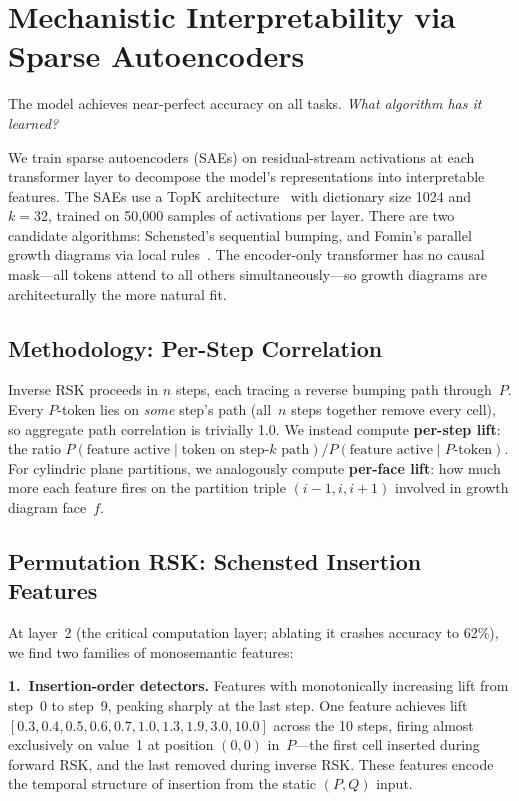 \documentclass[11pt,a4paper]{article}
\begin{document}
\section{Mechanistic Interpretability via Sparse Autoencoders}

The model achieves near-perfect accuracy on all tasks. \emph{What algorithm has it learned?}

We train sparse autoencoders (SAEs) on residual-stream activations at each transformer layer to decompose the model's representations into interpretable features. The SAEs use a TopK architecture~\cite{bricken2023} with dictionary size 1024 and $k{=}32$, trained on 50{,}000 samples of activations per layer. There are two candidate algorithms: Schensted's sequential bumping, and Fomin's parallel growth diagrams via local rules~\cite{langer2013}. The encoder-only transformer has no causal mask---all tokens attend to all others simultaneously---so growth diagrams are architecturally the more natural fit.

\subsection{Methodology: Per-Step Correlation}

Inverse RSK proceeds in $n$ steps, each tracing a reverse bumping path through~$P$. Every $P$-token lies on \emph{some} step's path (all~$n$ steps together remove every cell), so aggregate path correlation is trivially 1.0. We instead compute \textbf{per-step lift}: the ratio $P(\text{feature active} \mid \text{token on step-$k$ path}) / P(\text{feature active} \mid \text{$P$-token})$. For cylindric plane partitions, we analogously compute \textbf{per-face lift}: how much more each feature fires on the partition triple $(i{-}1, i, i{+}1)$ involved in growth diagram face~$f$.

\subsection{Permutation RSK: Schensted Insertion Features}

At layer~2 (the critical computation layer; ablating it crashes accuracy to 62\%), we find two families of monosemantic features:

\textbf{1.~Insertion-order detectors.}
Features with monotonically increasing lift from step~0 to step~9, peaking sharply at the last step. One feature achieves lift $[0.3, 0.4, 0.5, 0.6, 0.7, 1.0, 1.3, 1.9, 3.0, 10.0]$ across the 10 steps, firing almost exclusively on value~1 at position $(0,0)$ in~$P$---the first cell inserted during forward RSK, and the last removed during inverse RSK. These features encode the temporal structure of insertion from the static $(P, Q)$ input.
\end{document}
